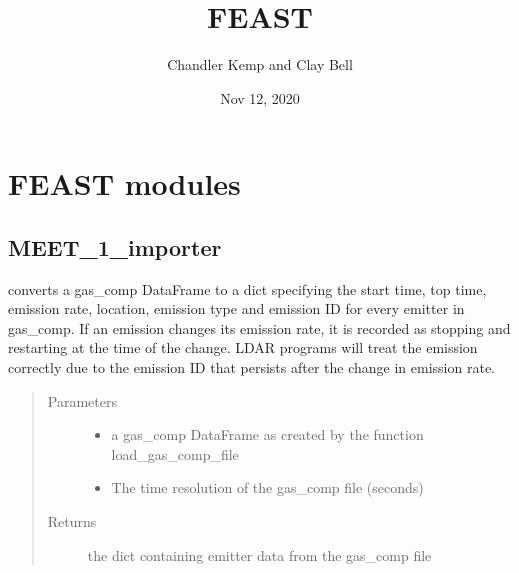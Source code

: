 \documentclass[letterpaper,10pt,english]{sphinxmanual}
\title{FEAST}
\date{Nov 12, 2020}
\author{Chandler Kemp and Clay Bell}
\begin{document}
\pagestyle{empty}
\sphinxmaketitle
\pagestyle{plain}
\sphinxtableofcontents
\pagestyle{normal}
\label{\detokenize{index::doc}}



\chapter{FEAST modules}
\label{\detokenize{index:feast-modules}}

\section{MEET\_1\_importer}
\label{\detokenize{index:module-feast.MEET_1_importer}}\label{\detokenize{index:meet-1-importer}}

\begin{fulllineitems}
\label{\detokenize{index:feast.MEET_1_importer.gas_comp_to_dict}}
converts a gas\_comp DataFrame to a dict specifying the start time, top time, emission rate, location,
emission type and emission ID for every emitter in gas\_comp. If an emission changes its emission rate,
it is recorded as stopping and restarting at the time of the change. LDAR programs will treat the emission
correctly due to the emission ID that persists after the change in emission rate.
\begin{quote}\begin{description}
\item[{Parameters}] \leavevmode\begin{itemize}
\item {} 
 \textendash{} a gas\_comp DataFrame as created by the function load\_gas\_comp\_file

\item {} 
 \textendash{} The time resolution of the gas\_comp file (seconds)

\end{itemize}

\item[{Returns}] \leavevmode
the dict containing emitter data from the gas\_comp file

\end{description}\end{quote}

\end{fulllineitems}
\end{document}
